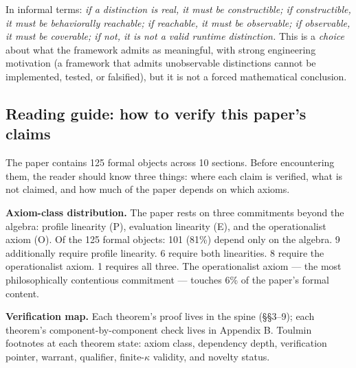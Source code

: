 In informal terms: \emph{if a distinction is real, it must
be constructible; if constructible, it must be behaviorally
reachable; if reachable, it must be observable; if
observable, it must be coverable; if not, it is not a valid
runtime distinction.} This is a \emph{choice} about what
the framework admits as meaningful, with strong engineering
motivation (a framework that admits unobservable distinctions
cannot be implemented, tested, or falsified), but it is not
a forced mathematical conclusion.

\subsection{Reading guide: how to verify this paper's claims}
\label{sec:reading-guide}

The paper contains 125 formal objects across 10 sections.
Before encountering them, the reader should know three
things: where each claim is verified, what is not claimed,
and how much of the paper depends on which axioms.

\medskip
\noindent\textbf{Axiom-class distribution.}
The paper rests on three commitments beyond the algebra:
profile linearity (\textsf{P}), evaluation linearity
(\textsf{E}), and the operationalist axiom (\textsf{O}).
Of the 125 formal objects: 101 (81\%) depend only on
the algebra. 9 additionally require profile linearity.
6 require both linearities. 8 require the operationalist
axiom. 1 requires all three. The operationalist axiom
--- the most philosophically contentious commitment ---
touches 6\% of the paper's formal content.

\medskip
\noindent\textbf{Verification map.}
Each theorem's proof lives in the spine (\S\S3--9); each
theorem's component-by-component check lives in Appendix
B. Toulmin footnotes at each theorem state: axiom class,
dependency depth, verification pointer, warrant, qualifier,
finite-$\kappa$ validity, and novelty status.

